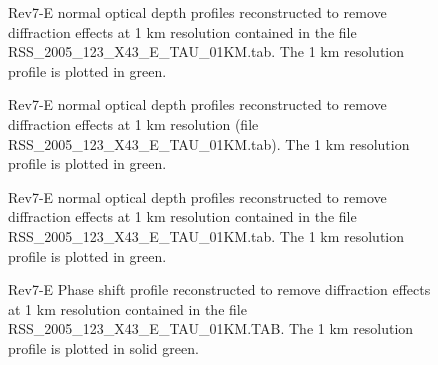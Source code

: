 \documentclass[crop=false,class=book]{standalone}
\begin{document}
\begin{figure}[H]
    \centering
    \caption[Normal Optical Depth Profiles 100000-115000km]{Rev7-E normal optical depth profiles reconstructed to remove diffraction effects at 1 km resolution contained in the file RSS\_2005\_123\_X43\_E\_TAU\_01KM.tab. The 1 km resolution profile is plotted in green.}
\end{figure}
\begin{figure}[H]
    \centering
    \caption[Normal Optical Depth Profiles 115000-130000km]{Rev7-E normal optical depth profiles reconstructed to remove diffraction effects at 1 km resolution (file RSS\_2005\_123\_X43\_E\_TAU\_01KM.tab). The 1 km resolution profile is plotted in green.}
\end{figure}
\begin{figure}[H]
    \centering
    \caption[Normal Optical Depth Profiles 130000-145000km]{Rev7-E normal optical depth profiles reconstructed to remove diffraction effects at 1 km resolution contained in the file RSS\_2005\_123\_X43\_E\_TAU\_01KM.tab. The 1 km resolution profile is plotted in green.}
\end{figure}
\begin{figure}[H]
    \centering
    \caption[Phase Shift Profile]{Rev7-E Phase shift profile reconstructed to remove diffraction effects at 1 km resolution contained in the file RSS\_2005\_123\_X43\_E\_TAU\_01KM.TAB. The 1 km resolution profile is plotted in solid green.}
\end{figure}
\end{document}
